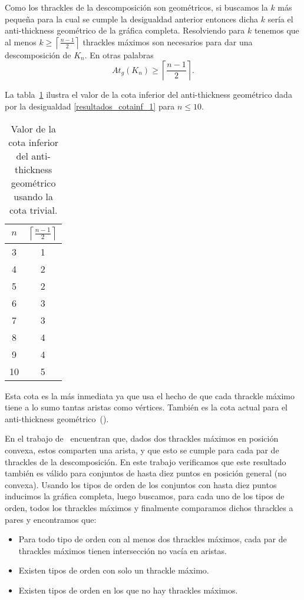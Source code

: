 Como los thrackles de la descomposición son geométricos, si buscamos la $k$ más
pequeña para la cual se cumple la desigualdad anterior entonces  dicha $k$
sería el anti-thickness geométrico de la gráfica completa.
Resolviendo para $k$  tenemos que al menos
$k\geq\left\lceil\frac{n-1}{2}\right\rceil$ thrackles máximos son necesarios
para dar una descomposición de $K_n$. En otras palabras
\begin{equation}
  At_g(K_n) \geq  \left\lceil\frac{n-1}{2}\right\rceil.
  \label{resultados_cotainf_1}
\end{equation}

La tabla~\ref{table:attrivialinf} ilustra el valor de la cota inferior del
anti-thickness geométrico dada por la desigualdad \ref{resultados_cotainf_1}
para $n\leq 10$.
\begin{table}[t]
  \centering
  \begin{tabular}{|c|c|}
    \hline
    $n$ & $\left\lceil\frac{n-1}{2}\right\rceil$ \\[5pt] \hline\hline
    3   & 1  \\
    4   & 2  \\
    5   & 2  \\
    6   & 3  \\
    7   & 3  \\
    8   & 4  \\
    9   & 4  \\
    10  & 5  \\ \hline
  \end{tabular}
  \caption{ Valor de la cota inferior del anti-thickness geométrico usando la cota trivial. }
  \label{table:attrivialinf}
\end{table}
Esta cota es la más inmediata ya que usa el hecho de que cada thrackle máximo tiene a lo sumo tantas aristas como vértices. También es la cota actual para el anti-thickness geométrico~(\cite{Dujmovic2017}).

En el trabajo de~\cite{Fabila-Monroy2018} encuentran que, dados dos thrackles
máximos en posición convexa, estos comparten una arista, y que esto se cumple
para cada par de thrackles de la descomposición. En este trabajo verificamos
que este resultado también es válido para conjuntos de hasta diez puntos en
posición general (no convexa). Usando los tipos de orden de los conjuntos
con hasta diez puntos inducimos la gráfica completa, luego buscamos, para
cada uno de los tipos de orden, todos los thrackles máximos y
finalmente comparamos dichos thrackles a pares y encontramos que:
\begin{itemize}
  \item Para todo tipo de orden con al menos dos thrackles máximos, cada par de thrackles máximos tienen intersección no vacía en aristas.
  \item Existen tipos de orden con solo un thrackle máximo.
  \item Existen tipos de orden en los que no hay thrackles máximos.
\end{itemize}

